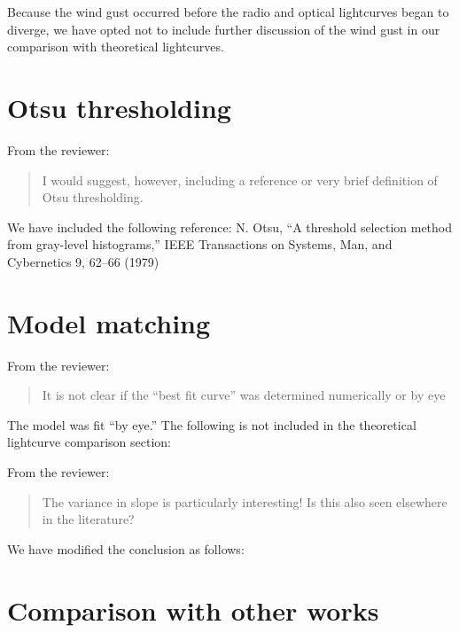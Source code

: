 \documentclass{article}
\begin{document}
\noindent Because the wind gust occurred before the radio and optical lightcurves began to diverge, we have opted not to include further discussion of the wind gust in our comparison with theoretical lightcurves.

\section{Otsu thresholding}

From the reviewer:

\begin{quote}
  I would suggest, however, including a reference or very brief definition of Otsu thresholding.
\end{quote}

\noindent We have included the following reference: N. Otsu, “A threshold selection method from gray-level histograms,” IEEE Transactions on Systems, Man, and Cybernetics 9, 62–66 (1979)

\section{Model matching}

From the reviewer:

\begin{quote}
  It is not clear if the ``best fit curve'' was determined numerically or by eye
\end{quote}

\noindent The model was fit ``by eye.'' The following is not included in the theoretical lightcurve comparison section:

\begin{quote}
  
\end{quote}

From the reviewer:

\begin{quote}

  The variance in slope is particularly interesting! Is this also seen elsewhere in the literature?

\end{quote}

\noindent We have modified the conclusion as follows:

\begin{quote}
  
\end{quote}

\section{Comparison with other works}
\end{document}
